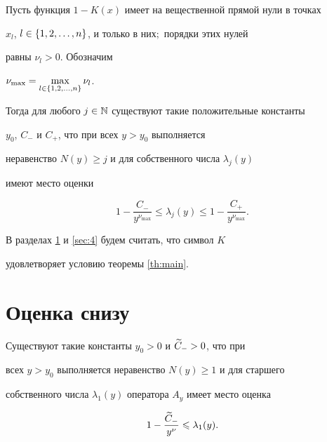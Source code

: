 \begin{thms} \label{th:general}


Пусть функция $1-K(x)$ имеет на вещественной прямой нули в точках


$x_{l}$, $l\in\left\{1,2,\dotsc,n\right\}$, и только в них\/$;$ порядки этих нулей 


равны $\nu_{l}>0$. Обозначим


$\nu_{\max}=\max\limits_{l\in\left\{1,2,\dotsc,n\right\}}\nu_{l}$.


Тогда для любого $j\in\Bbb N$ существуют такие положительные константы


$y_{0}$, $C_{-}$ и $C_{+}$, что при всех $y>y_{0}$ выполняется 


неравенство $N(y)\geqslant j$ и для собственного числа $\lambda_{j}(y)$ 


имеют место оценки


$$


1-\frac{C_{-}}{y^{\nu_{\max}}} \leqslant \lambda_{j}(y)


\leqslant 1-\frac{C_{+}}{y^{\nu_{\max}}}.


$$


\end{thms}





В разделах \ref{sec:3} и \ref{sec:4} будем считать, что символ $K$ 


удовлетворяет условию теоремы \ref{th:main}.








\section{Оценка снизу} \label{sec:3}








\begin{lems} \label{le:31}


Существуют такие константы $y_{0}>0$ и $\widetilde{C}_{-}>0$, что при 


всех $y>y_{0}$ выполняется неравенство $N(y)\geqslant 1$ и для старшего 


собственного числа $\lambda_{1}(y)$ оператора $A_{y}$ имеет место оценка


$$


1-\frac{\tld{C}_{-}}{y^{\nu}}\leqslant\lambda_{1}(y).


$$


\end{lems}








